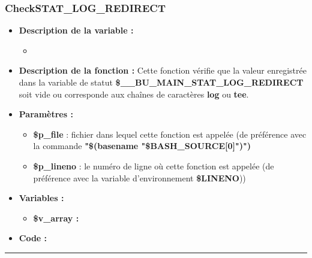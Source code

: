 \documentclass[a4paper,10pt]{article}
\begin{document}
\color{blue}
\subsubsection{CheckSTAT\_LOG\_REDIRECT}\color{white}
\begin{itemize}
    \item \textbf{Description de la variable :}
    \begin{itemize}
        \item \textbf{}\\[1\baselineskip]
    \end{itemize}

    \item \textbf{Description de la fonction :} Cette fonction vérifie que la valeur enregistrée dans la variable de statut \textbf{\color{orange}\$\_\_BU\_MAIN\_STAT\_LOG\_REDIRECT} soit vide ou corresponde aux chaînes de caractères \textbf{log} ou \textbf{tee}.\\[1\baselineskip]

    \item \textbf{Paramètres :}
    \begin{itemize}
        \item \color{orange}\textbf{\$p\_file}\color{white} : fichier dans lequel cette fonction est appelée (de préférence avec la commande \textbf{"\$(\color{gray}basename \color{white}"\color{orange}\$BASH\_SOURCE[0]\color{white}")")}\\[1\baselineskip]

        \item \color{orange}\textbf{\$p\_lineno}\color{white} : le numéro de ligne où cette fonction est appelée (de préférence avec la variable d'environnement \textbf{\color{orange}\$LINENO}))\\[1\baselineskip]
    \end{itemize}

    \item \textbf{Variables :}
    \begin{itemize}
        \item \textbf{\color{orange}\$v\_array\color{white} :}\\[1\baselineskip]
    \end{itemize}

    \item \textbf{Code :}
\end{itemize}


\color{blue}\par\noindent\rule{\textwidth}{0.4pt}\color{white}
\end{document}
